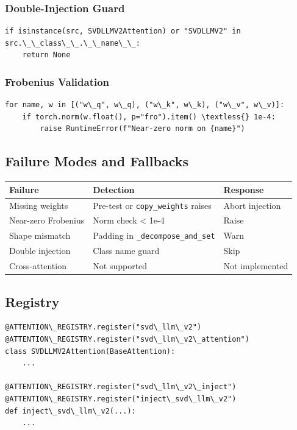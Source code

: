 \subsubsection{Double-Injection Guard}

\begin{lstlisting}
if isinstance(src, SVDLLMV2Attention) or "SVDLLMV2" in src.\_\_class\_\_.\_\_name\_\_:
    return None
\end{lstlisting}

\subsubsection{Frobenius Validation}

\begin{lstlisting}
for name, w in [("w\_q", w\_q), ("w\_k", w\_k), ("w\_v", w\_v)]:
    if torch.norm(w.float(), p="fro").item() \textless{} 1e-4:
        raise RuntimeError(f"Near-zero norm on {name}")
\end{lstlisting}

\subsection{Failure Modes and Fallbacks}

\begin{table}[H]
\centering
\small
\begin{tabular}{lll}
\toprule
\textbf{Failure} & \textbf{Detection} & \textbf{Response} \\
\midrule
Missing weights & Pre-test or \texttt{copy\_weights} raises & Abort injection \\
Near-zero Frobenius & Norm check \textless{} 1e-4 & Raise \\
Shape mismatch & Padding in \texttt{\_decompose\_and\_set} & Warn \\
Double injection & Class name guard & Skip \\
Cross-attention & Not supported & Not implemented \\
\bottomrule
\end{tabular}
\end{table}

\subsection{Registry}

\begin{lstlisting}
@ATTENTION\_REGISTRY.register("svd\_llm\_v2")
@ATTENTION\_REGISTRY.register("svd\_llm\_v2\_attention")
class SVDLLMV2Attention(BaseAttention):
    ...

@ATTENTION\_REGISTRY.register("svd\_llm\_v2\_inject")
@ATTENTION\_REGISTRY.register("inject\_svd\_llm\_v2")
def inject\_svd\_llm\_v2(...):
    ...
\end{lstlisting}

